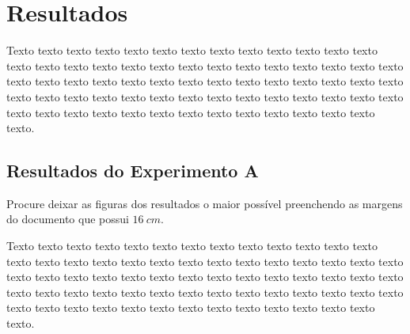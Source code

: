 \chapter{Resultados}
\label{chap:resultados}

Texto texto texto texto texto texto texto texto texto texto texto texto texto texto texto texto texto texto texto texto texto texto texto texto texto texto texto texto texto texto texto texto texto texto texto texto texto texto texto texto texto texto texto texto texto texto texto texto texto texto texto texto texto texto texto texto texto texto texto texto texto texto texto texto texto texto texto texto texto.

\section{Resultados do Experimento A}
\label{sec:resultados-do-experimento-a}

Procure deixar as figuras dos resultados o maior possível preenchendo as margens do documento que possui $16~cm$.

\begin{figure}[h!]
        \captionsetup{width=16cm}
\end{figure}

Texto texto texto texto texto texto texto texto texto texto texto texto texto texto texto texto texto texto texto texto texto texto texto texto texto texto texto texto texto texto texto texto texto texto texto texto texto texto texto texto texto texto texto texto texto texto texto texto texto texto texto texto texto texto texto texto texto texto texto texto texto texto texto texto texto texto texto texto texto.

